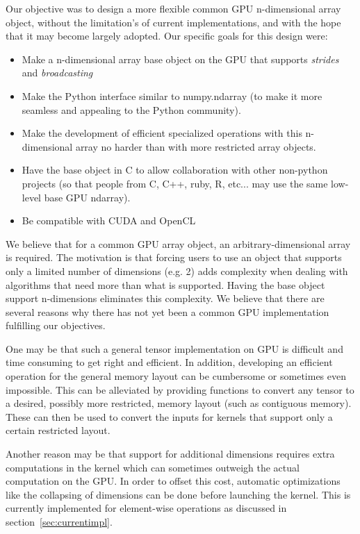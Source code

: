 \documentclass{article} %
\begin{document}
Our objective was to design a more flexible common GPU n-dimensional array object, 
without the limitation's of current implementations, and with the hope that it may become largely adopted. 
Our specific goals for this design were:

\begin{itemize}
\item Make a n-dimensional array base object on the GPU that supports \emph{strides} and \emph{broadcasting}
\item Make the Python interface similar to numpy.ndarray (to make it more seamless and appealing to the Python community).
\item Make the development of efficient specialized operations with this n-dimensional array no harder than with more restricted array objects. 
\item Have the base object in C to allow collaboration with other non-python projects (so that people from C, C++, ruby, R, etc... may use the same low-level base GPU ndarray).
\item Be compatible with CUDA and OpenCL
\end{itemize}

We believe that for a common GPU array object, an arbitrary-dimensional array is required.
The motivation is that forcing users to use an object that supports only a limited number of dimensions (e.g. 2) 
adds complexity when dealing with algorithms that need more than what is supported. %
Having the base object support n-dimensions eliminates this complexity.
We believe that there are several reasons why there has not yet been a common GPU implementation fulfilling our objectives.

One may be that such a general tensor implementation on GPU is difficult and time consuming to get right and efficient.
In addition, developing an efficient operation for the general memory layout can be cumbersome or sometimes even impossible.
This can be alleviated by providing functions to convert any tensor to a desired, possibly more restricted, memory layout (such as contiguous memory).
These can then be used to convert the inputs for kernels that support only a certain restricted layout.

Another reason may be that support for additional dimensions requires extra computations in the kernel which can sometimes outweigh the actual computation on the GPU.
In order to offset this cost, automatic optimizations like the collapsing of dimensions can be done before launching the kernel.  
This is currently implemented for element-wise operations as discussed in section~\ref{sec:currentimpl}.
\end{document}
